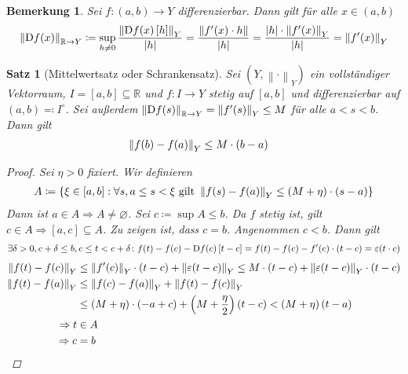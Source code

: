 \documentclass[11pt, twoside, a4paper]{article}
\theoremstyle{plain}
\newtheorem{bemerkung}[blockelement]{Bemerkung}
\newtheorem{satz}[blockelement]{Satz}
\numberwithin{equation}{subsection}
\newcommand{\set}[1]{\left\{#1\right\}}
\newcommand{\pair}[1]{\left(#1\right)}
\newcommand{\of}[1]{\mathopen{}\mathclose{}\bgroup\left(#1\aftergroup\egroup\right)}
\newcommand{\abs}[1]{\left\lvert#1\right\rvert}
\newcommand{\norm}[1]{\left\lVert#1\right\rVert}
\newcommand{\interv}[1]{\left[#1\right]}
\newcommand{\impl}[0]{\Rightarrow{}}
\newcommand{\fromto}{\rightarrow{}}
\renewcommand{\emptyset}{\varnothing}
\DeclareMathOperator{\D}{D\!}
\newcommand{\R}{\mathbb{R}}
\begin{document}
    \begin{bemerkung}
        Sei $f: \pair{a,b}\fromto Y$ differenzierbar. Dann gilt für alle $x\in\pair{a,b}$
        \begin{align*}
            \norm{\D f\of{x}}_{\R\fromto Y} \coloneqq \sup_{h\neq 0} \frac{\norm{\D f\of{x}\interv{h}}_Y}{\abs{h}} = \frac{\norm{f'\of{x}\cdot h}}{\abs{h}} = \frac{\abs{h}\cdot\norm{f'\of{x}}_Y}{\abs{h}} = \norm{f'\of{x}}_Y
        \end{align*}
    \end{bemerkung}

    \begin{satz}[Mittelwertsatz oder Schrankensatz] %
        \label{satz:mittelwertsatz}
        Sei $\pair{Y, \norm{\cdot}_Y}$ ein vollständiger Vektorraum, $I=\interv{a,b}\subseteq\R$ und $f: I\fromto Y$ stetig auf $\interv{a,b}$ und differenzierbar auf $\pair{a,b}\eqqcolon I^{\circ}$. Sei außerdem $\norm{\D f\of{s}}_{\R\fromto Y} = \norm{f'\of{s}}_Y \leq M$ für alle $a < s < b$. Dann gilt
        \begin{align*}
            \norm{f\of{b}-f\of{a}}_Y &\leq M\cdot\pair{b-a}
        \end{align*}

        \begin{proof}
            Sei $\eta > 0$ fixiert. Wir definieren
            \begin{align*}
                A\coloneqq\set{\xi\in\interv{a,b}: \forall s, a\leq s < \xi\text{ gilt } \norm{f\of{s}-f\of{a}}_{Y} \leq \pair{M+\eta}\cdot\pair{s-a}}
            \end{align*}
            Dann ist $a\in A\impl A\neq \emptyset$. Sei $c\coloneqq \sup A \leq b$. Da $f$ stetig ist, gilt $c\in A \impl \interv{a,c}\subseteq A$. Zu zeigen ist, dass $c=b$. Angenommen $c<b$. Dann gilt
            \begin{align*}
                \exists\delta > 0, c+\delta \leq b, c\leq t < c+\delta\colon f\of{t} - f\of{c} - \D f\of{c}\interv{t-c} = f\of{t} - f\of{c} - f'\of{c}\cdot\pair{t-c} = \varepsilon\of{t\cdot c}
            \end{align*}
            \begin{align*}
                \norm{f\of{t} - f\of{c}}_Y &\leq \norm{f'\of{c}}_Y \cdot\pair{t-c} + \norm{\varepsilon\of{t-c}}_Y \leq M\cdot\pair{t-c} + \norm{\varepsilon\of{t-c}}_Y\cdot\pair{t-c}\\
                \norm{f\of{t} - f\of{a}}_Y &\leq \norm{f\of{c} - f\of{a}}_Y + \norm{f\of{t} - f\of{c}}_Y\\
                &\leq \pair{M + \eta}\cdot\pair{-a+c} + \pair{M+\frac{\eta}{2}}\pair{t-c} < \pair{M+\eta}\pair{t-a}\\
                \impl t&\in A\\
                \impl c&= b\qedhere
            \end{align*}
        \end{proof}
    \end{satz}
\end{document}

